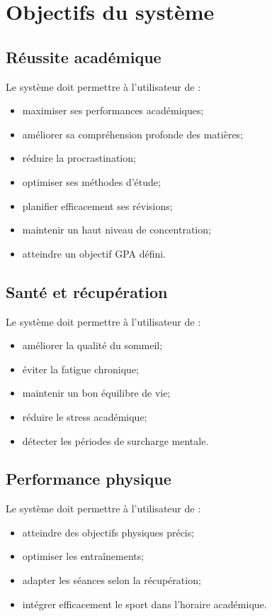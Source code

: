 \documentclass[12pt]{article}
\begin{document}
\section{Objectifs du système}

\subsection{Réussite académique}

Le système doit permettre à l’utilisateur de :
\begin{itemize}
    \item maximiser ses performances académiques;
    \item améliorer sa compréhension profonde des matières;
    \item réduire la procrastination;
    \item optimiser ses méthodes d’étude;
    \item planifier efficacement ses révisions;
    \item maintenir un haut niveau de concentration;
    \item atteindre un objectif GPA défini.
\end{itemize}

\subsection{Santé et récupération}

Le système doit permettre à l’utilisateur de :
\begin{itemize}
    \item améliorer la qualité du sommeil;
    \item éviter la fatigue chronique;
    \item maintenir un bon équilibre de vie;
    \item réduire le stress académique;
    \item détecter les périodes de surcharge mentale.
\end{itemize}

\subsection{Performance physique}

Le système doit permettre à l’utilisateur de :
\begin{itemize}
    \item atteindre des objectifs physiques précis;
    \item optimiser les entraînements;
    \item adapter les séances selon la récupération;
    \item intégrer efficacement le sport dans l’horaire académique.
\end{itemize}
\end{document}
